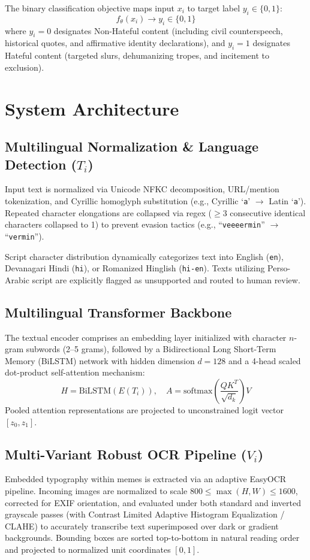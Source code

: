 \documentclass[11pt,a4paper]{article}
\begin{document}
The binary classification objective maps input $x_i$ to target label $y_i \in \{0, 1\}$:
\begin{equation}
    f_\theta(x_i) \to y_i \in \{0, 1\}
\end{equation}
where $y_i = 0$ designates Non-Hateful content (including civil counterspeech, historical quotes, and affirmative identity declarations), and $y_i = 1$ designates Hateful content (targeted slurs, dehumanizing tropes, and incitement to exclusion).

\section{System Architecture}

\subsection{Multilingual Normalization \& Language Detection ($T_i$)}
Input text is normalized via Unicode NFKC decomposition, URL/mention tokenization, and Cyrillic homoglyph substitution (e.g., Cyrillic `\texttt{а}' $\to$ Latin `\texttt{a}'). Repeated character elongations are collapsed via regex ($\ge 3$ consecutive identical characters collapsed to 1) to prevent evasion tactics (e.g., ``\texttt{veeeermin}'' $\to$ ``\texttt{vermin}''). 

Script character distribution dynamically categorizes text into English (\texttt{en}), Devanagari Hindi (\texttt{hi}), or Romanized Hinglish (\texttt{hi-en}). Texts utilizing Perso-Arabic script are explicitly flagged as unsupported and routed to human review.

\subsection{Multilingual Transformer Backbone}
The textual encoder comprises an embedding layer initialized with character $n$-gram subwords (2--5 grams), followed by a Bidirectional Long Short-Term Memory (BiLSTM) network with hidden dimension $d = 128$ and a 4-head scaled dot-product self-attention mechanism:
\begin{equation}
    H = \text{BiLSTM}(E(T_i)), \quad A = \text{softmax}\left(\frac{Q K^T}{\sqrt{d_k}}\right) V
\end{equation}
Pooled attention representations are projected to unconstrained logit vector $[z_0, z_1]$.

\subsection{Multi-Variant Robust OCR Pipeline ($V_i$)}
Embedded typography within memes is extracted via an adaptive EasyOCR pipeline. Incoming images are normalized to scale $800 \le \max(H, W) \le 1600$, corrected for EXIF orientation, and evaluated under both standard and inverted grayscale passes (with Contrast Limited Adaptive Histogram Equalization / CLAHE) to accurately transcribe text superimposed over dark or gradient backgrounds. Bounding boxes are sorted top-to-bottom in natural reading order and projected to normalized unit coordinates $[0, 1]$.
\end{document}
